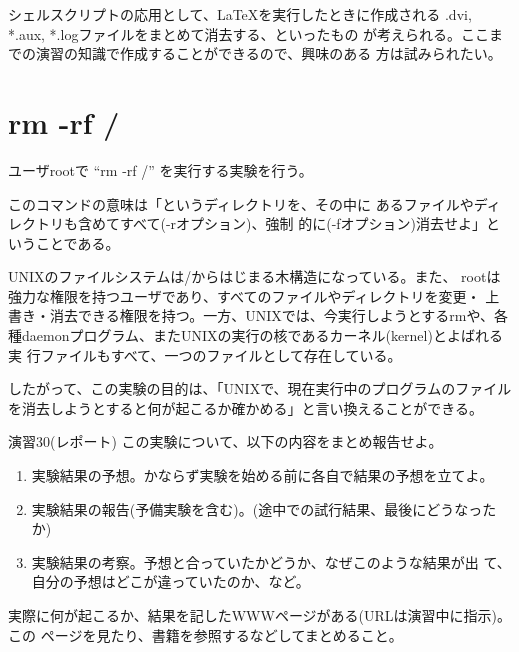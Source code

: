\documentclass[a4j,10pt]{jarticle}
\begin{document}
シェルスクリプトの応用として、\LaTeX を実行したときに作成される
{\sffamily *.dvi, *.aux, *.log}ファイルをまとめて消去する、といったもの
が考えられる。ここまでの演習の知識で作成することができるので、興味のある
方は試みられたい。

\section{rm -rf /}
ユーザrootで ``rm -rf {\slash}'' を実行する実験を行う。

このコマンドの意味は「{\sffamily {\slash}}というディレクトリを、その中に
あるファイルやディレクトリも含めてすべて({\sffamily -r}オプション)、強制
的に({\sffamily -f}オプション)消去せよ」ということである。

UNIXのファイルシステムは{\slash}からはじまる木構造になっている。また、
rootは強力な権限を持つユーザであり、すべてのファイルやディレクトリを変更・
上書き・消去できる権限を持つ。一方、UNIXでは、今実行しようとするrmや、各
種daemonプログラム、またUNIXの実行の核であるカーネル(kernel)とよばれる実
行ファイルもすべて、一つのファイルとして存在している。

したがって、この実験の目的は、「UNIXで、現在実行中のプログラムのファイル
を消去しようとすると何が起こるか確かめる」と言い換えることができる。

\begin{itembox}{演習30(レポート)}
この実験について、以下の内容をまとめ報告せよ。
\begin{enumerate}
 \item 実験結果の予想。かならず実験を始める前に各自で結果の予想を立てよ。
 \item 実験結果の報告(予備実験を含む)。(途中での試行結果、最後にどうなったか)
 \item 実験結果の考察。予想と合っていたかどうか、なぜこのような結果が出
       て、自分の予想はどこが違っていたのか、など。
\end{enumerate}
実際に何が起こるか、結果を記したWWWページがある(URLは演習中に指示)。この
ページを見たり、書籍を参照するなどしてまとめること。
\end{itembox}
\end{document}
